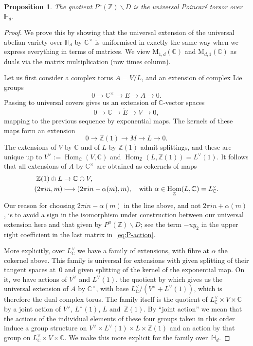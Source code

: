 \documentclass[11pt]{article}
\providecommand{\C}{}
\def\mto{\mathchoice{\longmapsto}{\mapsto}{\mapsto}{\mapsto}}
\let\oldvee\vee
\renewcommand{\vee}{{\scriptscriptstyle\oldvee}}
\theoremstyle{plain}
\newtheorem{Proposition}[subsection]{Proposition}
\theoremstyle{definition}
\numberwithin{equation}{subsection}
\renewcommand{\C}{\mathbb C}
\newcommand{\Z}{\mathbb Z}
\renewcommand{\H}{\mathbb H}
\newcommand{\rmM}{\mathrm{M}}
\DeclareMathOperator{\Hom}{Hom}
\begin{document}
\begin{Proposition}\label{prop:MSV_and_PT}
The quotient $P^u(\Z)\backslash D$ is the universal Poincaré torsor over~$\H_d$.
\end{Proposition}
\begin{proof}
We prove this by showing that the universal extension of the
universal abelian variety over $\H_d$ by $\C^\times$ is uniformised
in exactly the same way when we express everything in terms of
matrices. We view $\rmM_{1,d}(\C)$ and $\rmM_{d,1}(\C)$ as duals via
the matrix multiplication (row times column).

Let us first consider a complex torus $A=V/L$, and an extension of
complex Lie groups
\[
0 \to \C^\times \to E \to A \to 0.
\]
Passing to universal covers gives us an extension of $\C$-vector
spaces
\[
0 \to \C \to \tilde{E} \to V \to 0,
\]
mapping to the previous sequence by exponential maps. The kernels of
these maps form an extension
\[
0 \to \Z(1) \to M \to L \to 0.
\]
The extensions of $V$ by $\C$ and of $L$ by $\Z(1)$ admit splittings,
and these are unique up to $V^\vee:=\Hom_\C(V,\C)$ and
$\Hom_\Z(L,\Z(1))=L^\vee(1)$. It follows that all extensions of $A$ by
$\C^\times$ are obtained as cokernels of maps
\begin{equation}\label{eq:cokernels}
\begin{aligned}
\Z(1)\oplus L & \to \C\oplus V,\\
(2\pi in,m)& \mto (2\pi i n - \alpha(m),m),\quad \text{with
$\alpha\in\Hom_\Z(L,\C)=L_\C^\vee$.}
\end{aligned}
\end{equation}
Our reason for choosing $2\pi i n-\alpha(m)$ in the line above, and
not $2\pi i n+\alpha(m)$, is to avoid a sign in the isomorphism under
construction between our universal extension here and that given by
$P^u(\Z)\backslash D$; see the term $-uy_2$ in the upper right
coefficient in the last matrix in~\eqref{eq:P-action}.

More explicitly, over $L_\C^\vee$ we have a family of extensions, with
fibre at $\alpha$ the cokernel above. This family is universal for
extensions with given splitting of their tangent spaces at~$0$ and
given splitting of the kernel of the exponential map. On it, we have
actions of $V^\vee$ and $L^\vee(1)$, the quotient by which gives us
the universal extension of $A$ by $\C^\times$, with base
$L_\C^\vee/(V^\vee+L^\vee(1))$, which is therefore the dual complex
torus. The family itself is the quotient of $L_\C^\vee\times
V\times\C$ by a joint action of $V^\vee$, $L^\vee(1)$, $L$
and~$\Z(1)$. By ``joint action'' we mean that the actions of the
individual elements of these four groups taken in this order induce a
group structure on $V^\vee\times L^\vee(1)\times L\times\Z(1)$ and an
action by that group on $L_\C^\vee\times V\times\C$. We make this more
explicit for the family over~$\H_d$.


\end{proof}
\end{document}
